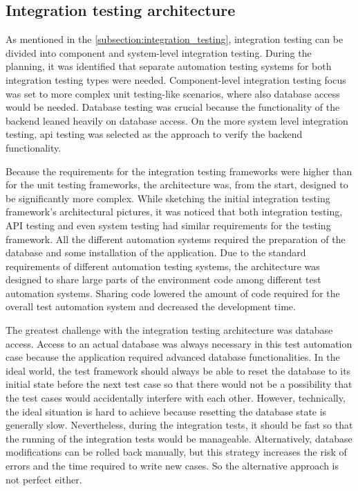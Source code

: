 \subsection{Integration testing architecture}\label{subsection:integration_testing_architecture}
As mentioned in the \autoref{subsection:integration_testing}, integration testing can be divided into component and system-level integration testing. During the planning, it was identified that separate automation testing systems for both integration testing types were needed. Component-level integration testing focus was set to more complex unit testing-like scenarios, where also database access would be needed. Database testing was crucial because the functionality of the backend leaned heavily on database access. On the more system level integration testing, \gls{api} testing was selected as the approach to  verify the backend functionality.

Because the requirements for the integration testing frameworks were higher than for the unit testing frameworks, the architecture was, from the start, designed to be significantly more complex. While sketching the initial integration testing framework's architectural pictures, it was noticed that both integration testing, API testing and even system testing had similar requirements for the testing framework. All the different automation systems required the preparation of the database and some installation of the application. Due to the standard requirements of different automation testing systems, the architecture was designed to share large parts of the environment code among different test automation systems. Sharing code lowered the amount of code required for the overall test automation system and decreased the development time.

The greatest challenge with the integration testing architecture was database access. Access to an actual database was always necessary in this test automation case because the application required advanced database functionalities. In the ideal world, the test framework should always be able to reset the database to its initial state before the next test case so that there would not be a possibility that the test cases would accidentally interfere with each other. However, technically, the ideal situation is hard to achieve because resetting the database state is generally slow. Nevertheless, during the integration tests, it should be fast so that the running of the integration tests would be manageable. Alternatively, database modifications can be rolled back manually, but this strategy increases the risk of errors and the time required to write new cases. So the alternative approach is not perfect either.

